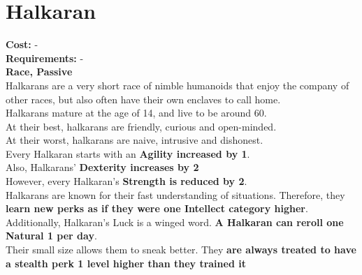 \section{Halkaran}
\textbf{Cost:} -\\
\textbf{Requirements:} -\\
\textbf{Race, Passive}\\
Halkarans are a very short race of nimble humanoids that enjoy the company of other races, but also often have their own enclaves to call home.\\
Halkarans mature at the age of 14, and live to be around 60.\\
At their best, halkarans are friendly, curious and open-minded.\\
At their worst, halkarans are naive, intrusive and dishonest.\\
Every Halkaran starts with an \textbf{Agility increased by 1}.\\
Also, Halkarans' \textbf{Dexterity increases by 2}\\
However, every Halkaran's \textbf{Strength is reduced by 2}.\\
Halkarans are known for their fast understanding of situations. Therefore, they \textbf{learn new perks as if they were one Intellect category higher}. Additionally, Halkaran's Luck is a winged word. \textbf{A Halkaran can reroll one Natural 1 per day}.\\
Their small size allows them to sneak better. They \textbf{are always treated to have a stealth perk 1 level higher than they trained it}